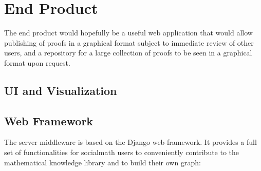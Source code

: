 \documentclass{acm_proc_article-sp}
\begin{document}
\section{End Product}
The end product would hopefully be a useful web application that would
allow publishing of proofs in a graphical format subject to immediate review
of other users, and a repository for a large collection of proofs to be
seen in a graphical format upon request.
\subsection{UI and Visualization}
\subsection{Web Framework}
The server middleware is based on the Django web-framework. It provides a full set of functionalities for socialmath users to conveniently contribute to the mathematical knowledge library and to build their own graph:
\end{document}
